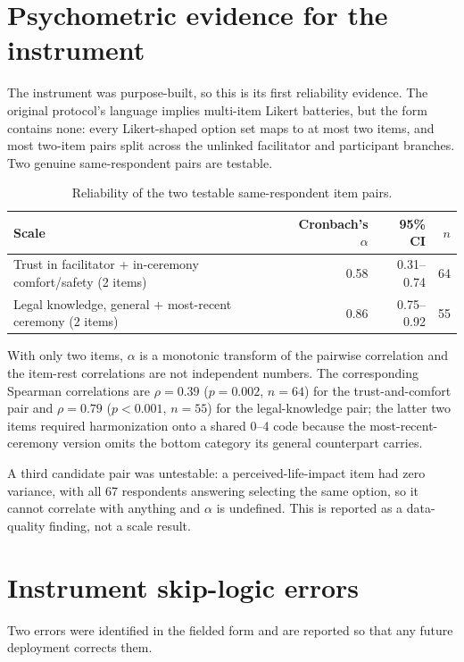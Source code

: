 \documentclass[12pt]{article}
\begin{document}
\section{Psychometric evidence for the instrument}

The instrument was purpose-built, so this is its first reliability evidence. The original protocol's
language implies multi-item Likert batteries, but the form contains none: every Likert-shaped option set
maps to at most two items, and most two-item pairs split across the unlinked facilitator and participant
branches. Two genuine same-respondent pairs are testable.

\begin{table}[htbp]
\centering
\caption{Reliability of the two testable same-respondent item pairs.}
\begin{tabular}{lrrr}
\toprule
Scale & Cronbach's $\alpha$ & 95\% CI & $n$ \\
\midrule
Trust in facilitator + in-ceremony comfort/safety (2 items) & 0.58 & 0.31--0.74 & 64 \\
Legal knowledge, general + most-recent ceremony (2 items) & 0.86 & 0.75--0.92 & 55 \\
\bottomrule
\end{tabular}
\end{table}

\noindent
With only two items, $\alpha$ is a monotonic transform of the pairwise correlation and the item-rest
correlations are not independent numbers. The corresponding Spearman correlations are $\rho=0.39$
($p=0.002$, $n=64$) for the trust-and-comfort pair and $\rho=0.79$ ($p<0.001$, $n=55$) for the
legal-knowledge pair; the latter two items required harmonization onto a shared 0--4 code because the
most-recent-ceremony version omits the bottom category its general counterpart carries.

A third candidate pair was untestable: a perceived-life-impact item had zero variance, with all 67
respondents answering selecting the same option, so it cannot correlate with anything and $\alpha$ is
undefined. This is reported as a data-quality finding, not a scale result.

\section{Instrument skip-logic errors}
\label{sec:logic}

Two errors were identified in the fielded form and are reported so that any future deployment corrects
them.
\end{document}
